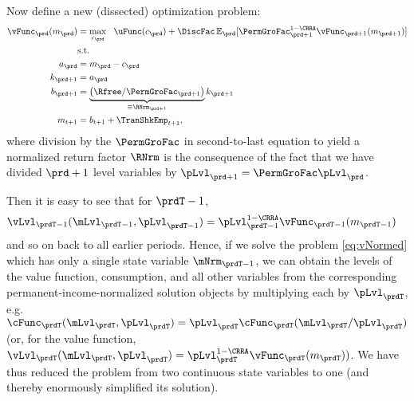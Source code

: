 Now define a new (dissected) optimization problem:
  \begin{equation}\begin{gathered}\begin{aligned}
        {\vFunc}_{\prd}({m}_{\prd}) & = \max_{{c}_{\prd}} ~~ \uFunc({c}_{\prd})+
        {\DiscFac}\Ex_{\prd}[ \PermGroFac_{\prd+1}^{1-\CRRA}{\vFunc}_{\prd+1}({m}_{\prd+1})] \label{eq:vNormed}                   \\
                                         & \text{s.t.}                                                                                 \\
        {a}_{\prd}                       & = {m}_{\prd}-{c}_{\prd}                                                                     \\
        {k}_{\prd+1}                     & = {a}_{\prd}                                                                                \\
        {b}_{\prd+1}                     & = \underbrace{\left(\Rfree/\PermGroFac_{\prd+1}\right)}_{\equiv \RNrm_{\prd+1}}{k}_{\prd+1} \\
        {m}_{t+1}                        & = {b}_{t+1}+\TranShkEmp_{t+1},
      \end{aligned}\end{gathered}\end{equation}
where division by the $\PermGroFac$ in second-to-last equation to yield a normalized return factor $\RNrm$ is the consequence of the fact that we have divided $\prd+1$ level variables by $\pLvl_{\prd+1}=\PermGroFac\pLvl_{\prd}$.

Then it is easy to see that for $\prdT-1$, 
\begin{equation*}\begin{gathered}\begin{aligned}
      {\vLvl}_{\prdT-1}(\mLvl_{\prdT-1},\pLvl_{\prdT-1}) & =  \pLvl_{\prdT-1}^{1-\CRRA}{\vFunc}_{\prdT-1}({m}_{\prdT-1})
    \end{aligned}\end{gathered}\end{equation*}
and so on back to all earlier periods.  Hence, if we solve the problem \eqref{eq:vNormed} which has only a single state variable $\mNrm_{\prdT-1}$, we can obtain the levels of the value function, consumption, and all other variables from the corresponding permanent-income-normalized solution objects by multiplying each by $\pLvl_{\prdT}$, e.g.\ ${\cFunc}_{\prdT}(\mLvl_{\prdT},\pLvl_{\prdT})=\pLvl_{\prdT}\cFunc_{\prdT}(\mLvl_{\prdT}/\pLvl_{\prdT})$ (or, for the value function, ${\vLvl} _{\prdT}({\mLvl}_{\prdT},\pLvl_{\prdT}) = \pLvl_{\prdT}^{1-\CRRA}\vFunc_{\prdT}({m}_{\prdT}))$.  We have thus reduced the problem from two continuous state variables to one (and thereby enormously simplified its solution).

